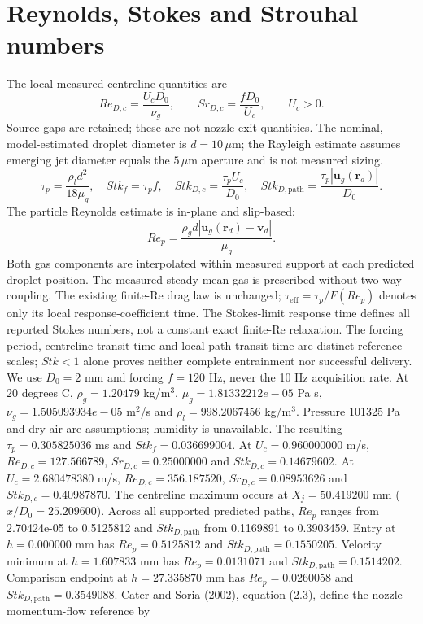 \section{Reynolds, Stokes and Strouhal numbers}
The local measured-centreline quantities are
\begin{equation}Re_{D,c}=\frac{U_c D_0}{\nu_g},\qquad Sr_{D,c}=\frac{fD_0}{U_c},\qquad U_c>0.\end{equation}
Source gaps are retained; these are not nozzle-exit quantities.
The nominal, model-estimated droplet diameter is $d=10\,\mu\mathrm m$;
the Rayleigh estimate assumes emerging jet diameter equals the $5\,\mu\mathrm m$ aperture and is not measured sizing.
\begin{equation}\tau_p=\frac{\rho_l d^2}{18\mu_g},\quad Stk_f=\tau_p f,\quad Stk_{D,c}=\frac{\tau_p U_c}{D_0},\quad Stk_{D,\mathrm{path}}=\frac{\tau_p|\mathbf u_g(\mathbf r_d)|}{D_0}.\end{equation}
The particle Reynolds estimate is in-plane and slip-based:
\begin{equation}Re_p=\frac{\rho_g d|\mathbf u_g(\mathbf r_d)-\mathbf v_d|}{\mu_g}.\end{equation}
Both gas components are interpolated within measured support at each predicted droplet position.
The measured steady mean gas is prescribed without two-way coupling. The existing finite-Re drag law is unchanged;
$\tau_{\mathrm{eff}}=\tau_p/F(Re_p)$ denotes only its local response-coefficient time.
The Stokes-limit response time defines all reported Stokes numbers, not a constant exact finite-Re relaxation.
The forcing period, centreline transit time and local path transit time are distinct reference scales;
$Stk<1$ alone proves neither complete entrainment nor successful delivery.
We use $D_0=2$ mm and forcing $f=120$ Hz, never the 10 Hz acquisition rate. At 20 degrees C, $\rho_g=1.20479$ kg/m$^3$, $\mu_g=1.81332212e-05$ Pa s, $\nu_g=1.505093934e-05$ m$^2$/s and $\rho_l=998.2067456$ kg/m$^3$. Pressure 101325 Pa and dry air are assumptions; humidity is unavailable. The resulting $\tau_p=0.305825036$ ms and $Stk_f=0.036699004$. At $U_c=0.960000000$ m/s, $Re_{D,c}=127.566789$, $Sr_{D,c}=0.25000000$ and $Stk_{D,c}=0.14679602$. At $U_c=2.680478380$ m/s, $Re_{D,c}=356.187520$, $Sr_{D,c}=0.08953626$ and $Stk_{D,c}=0.40987870$. The centreline maximum occurs at $X_j=50.419200$ mm ($x/D_0=25.209600$). Across all supported predicted paths, $Re_p$ ranges from 2.70424e-05 to 0.5125812 and $Stk_{D,\mathrm{path}}$ from 0.1169891 to 0.3903459. Entry at $h=0.000000$ mm has $Re_p=0.5125812$ and $Stk_{D,\mathrm{path}}=0.1550205$. Velocity minimum at $h=1.607833$ mm has $Re_p=0.0131071$ and $Stk_{D,\mathrm{path}}=0.1514202$. Comparison endpoint at $h=27.335870$ mm has $Re_p=0.0260058$ and $Stk_{D,\mathrm{path}}=0.3549088$. Cater and Soria (2002), equation (2.3), define the nozzle momentum-flow reference by
